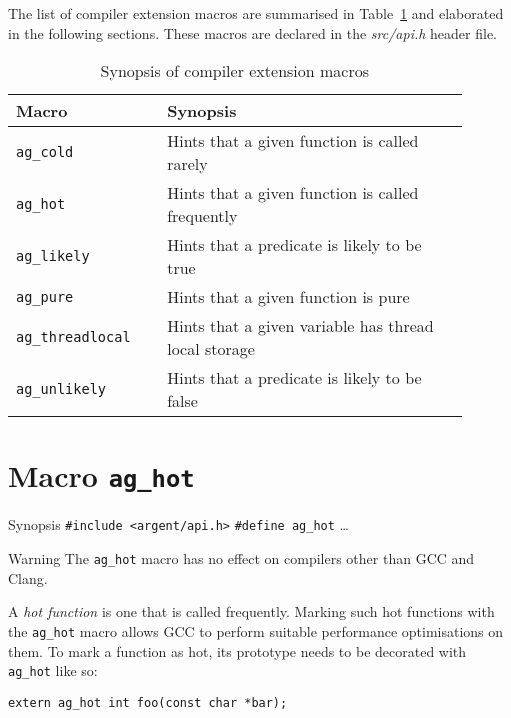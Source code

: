 The list of compiler extension macros are summarised in Table~\ref{tab:synopsis}
and elaborated in the following sections. These macros are declared in the
\emph{src/api.h} header file.

\renewcommand\arraystretch{1.1}
\begin{table}[!htbp]
\centering
\small
\begin{tabular}[t]{>{\centering}m{0.3\linewidth}
    >{\raggedright\arraybackslash}m{0.6\linewidth}}
\toprule
\textbf{Macro} & \textbf{Synopsis} \\
\midrule
\verb|ag_cold| & Hints that a given function is called rarely \\
\verb|ag_hot| & Hints that a given function is called frequently \\
\verb|ag_likely| & Hints that a predicate is likely to be true \\
\verb|ag_pure| & Hints that a given function is pure \\
\verb|ag_threadlocal| & Hints that a given variable has thread local 
    storage \\
\verb|ag_unlikely| & Hints that a predicate is likely to be false \\
\bottomrule
\end{tabular}
\caption{Synopsis of compiler extension macros}
\label{tab:synopsis}
\end{table}


\section{Macro \texttt{ag\_hot}}

\begin{bclogo}[logo=\bccrayon, noborder=true, barre=snake, couleurBarre=gray]
    {Synopsis}
  \verb|#include <argent/api.h>|
  \verb|#define ag_hot| \ldots
\end{bclogo}

\begin{bclogo}[logo=\bctakecare, noborder=true, couleurBarre=orange]{Warning}
  The \verb|ag_hot| macro has no effect on compilers other than GCC and Clang.
\end{bclogo}

A \emph{hot function} is one that is called frequently. Marking such hot
functions with the \verb|ag_hot| macro allows GCC to perform suitable
performance optimisations on them. To mark a function as hot, its prototype
needs to be decorated with \verb|ag_hot| like so:
\begin{lstlisting}[linewidth=1.0\linewidth]
extern ag_hot int foo(const char *bar);
\end{lstlisting}





